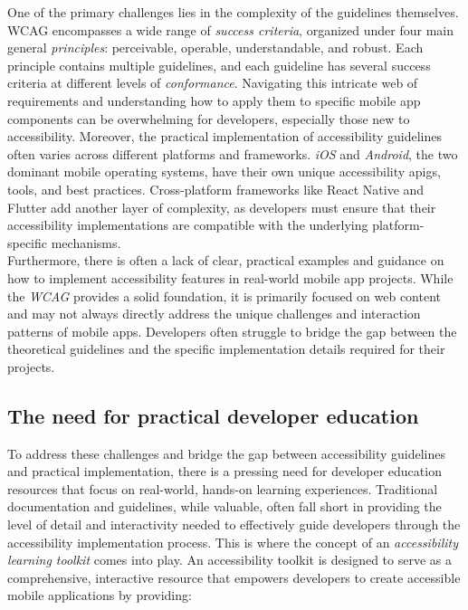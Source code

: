 One of the primary challenges lies in the complexity of the guidelines themselves. WCAG encompasses a wide range of \textit{success criteria}, organized under four main general \textit{principles}: perceivable, operable, understandable, and robust. Each principle contains multiple guidelines, and each guideline has several success criteria at different levels of \textit{conformance}. Navigating this intricate web of requirements and understanding how to apply them to specific mobile app components can be overwhelming for developers, especially those new to accessibility. 
Moreover, the practical implementation of accessibility guidelines often varies across different platforms and frameworks. \textit{iOS} and \textit{Android}, the two dominant mobile operating systems, have their own unique accessibility \gls{apig}s, tools, and best practices. Cross-platform frameworks like React Native and Flutter add another layer of complexity, as developers must ensure that their accessibility implementations are compatible with the underlying platform-specific mechanisms. \\ 

Furthermore, there is often a lack of clear, practical examples and guidance on how to implement accessibility features in real-world mobile app projects. While the \textit{WCAG} provides a solid foundation, it is primarily focused on web content and may not always directly address the unique challenges and interaction patterns of mobile apps. Developers often struggle to bridge the gap between the theoretical guidelines and the specific implementation details required for their projects.

\subsection{The need for practical developer education}

To address these challenges and bridge the gap between accessibility guidelines and practical implementation, there is a pressing need for developer education resources that focus on real-world, hands-on learning experiences. Traditional documentation and guidelines, while valuable, often fall short in providing the level of detail and interactivity needed to effectively guide developers through the accessibility implementation process.
This is where the concept of an \textit{accessibility learning toolkit} comes into play. An accessibility toolkit is designed to serve as a comprehensive, interactive resource that empowers developers to create accessible mobile applications by providing:


